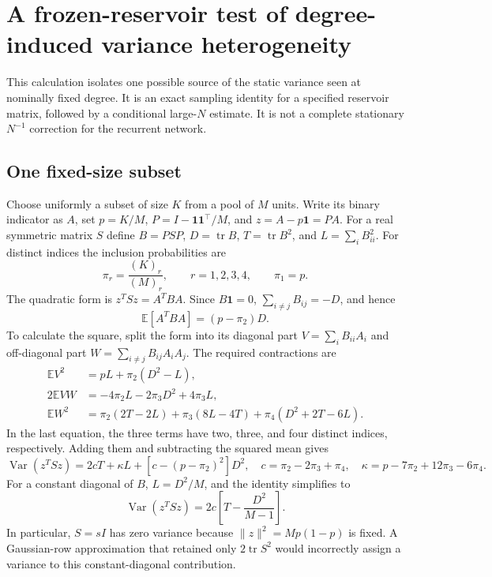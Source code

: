 \section{A frozen-reservoir test of degree-induced variance heterogeneity}
This calculation isolates one possible source of the static variance seen
at nominally fixed degree. It is an exact sampling identity for a specified
reservoir matrix, followed by a conditional large-$N$ estimate. It is not a
complete stationary $N^{-1}$ correction for the recurrent network.

\subsection{One fixed-size subset}
Choose uniformly a subset of size $K$ from a pool of $M$ units. Write its
binary indicator as $A$, set $p=K/M$, $P=I-\mathbf1\mathbf1^\top/M$, and
$z=A-p\mathbf1=PA$. For a real symmetric matrix $S$ define $B=PSP$,
$D=\operatorname{tr}B$, $T=\operatorname{tr}B^2$, and
$L=\sum_iB_{ii}^2$. For distinct indices the inclusion probabilities are
\[
 \pi_r=\frac{(K)_r}{(M)_r},\qquad r=1,2,3,4,\qquad \pi_1=p.
\]
The quadratic form is $z^TSz=A^TBA$. Since $B\mathbf1=0$,
$\sum_{i\ne j}B_{ij}=-D$, and hence
\[
 \mathbb E[A^TBA]=(p-\pi_2)D.
\]
To calculate the square, split the form into its diagonal part
$V=\sum_iB_{ii}A_i$ and off-diagonal part
$W=\sum_{i\ne j}B_{ij}A_iA_j$. The required contractions are
\begin{align*}
 \mathbb E V^2&=pL+\pi_2(D^2-L),\\
 2\mathbb E VW&=-4\pi_2L-2\pi_3D^2+4\pi_3L,\\
 \mathbb E W^2&=\pi_2(2T-2L)+\pi_3(8L-4T)
                      +\pi_4(D^2+2T-6L).
\end{align*}
In the last equation, the three terms have two, three, and four distinct
indices, respectively. Adding them and subtracting the squared mean gives
\begin{equation}
 \boxed{\operatorname{Var}(z^TSz)
 =2cT+\kappa L+[c-(p-\pi_2)^2]D^2,}
 \quad c=\pi_2-2\pi_3+\pi_4,\quad
 \kappa=p-7\pi_2+12\pi_3-6\pi_4.
 \label{eq:review_exact_fixed_qvar}
\end{equation}
For a constant diagonal of $B$, $L=D^2/M$, and the identity simplifies to
\begin{equation}
 \operatorname{Var}(z^TSz)=
 2c\left[T-\frac{D^2}{M-1}\right].
 \label{eq:review_const_diag_qvar}
\end{equation}
In particular, $S=sI$ has zero variance because $\|z\|^2=Mp(1-p)$ is fixed.
A Gaussian-row approximation that retained only $2\operatorname{tr}S^2$
would incorrectly assign a variance to this constant-diagonal contribution.

